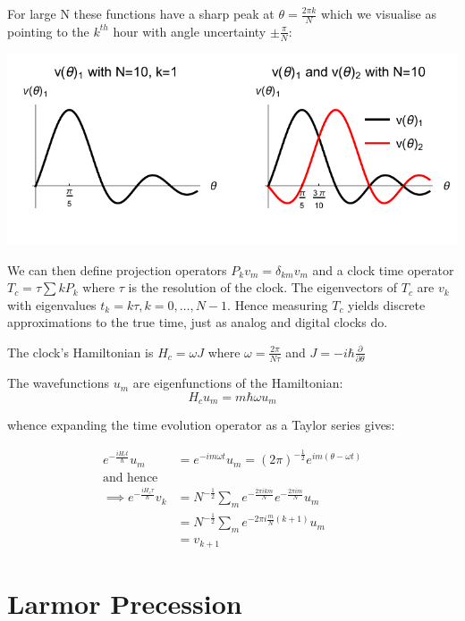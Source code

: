 \documentclass{article}
\begin{document}
For large N these functions have a sharp peak at $\theta = \frac{2\pi k}{N}$ which we visualise as pointing to the $k^{th}$ hour with angle uncertainty $\pm \frac{\pi}{N}$:

\begin{center}
\includegraphics{plot1.pdf}
\end{center}

We can then define projection operators $P_kv_m=\delta_{km}v_m$ and a clock time operator $T_c = \tau\sum{kP_k}$ where $\tau$ is the resolution of the clock. The eigenvectors of $T_c$ are $v_k$ with eigenvalues $t_k = k\tau, k=0,\dots,N-1$. Hence measuring $T_c$ yields discrete approximations to the true time, just as analog and digital clocks do. 

The clock's Hamiltonian is $H_c = \omega J$ where $\omega = \frac{2\pi}{N\tau}$ and $J=-i\hbar \frac{\partial}{\partial\theta}$

The wavefunctions $u_m$ are eigenfunctions of the Hamiltonian:
\[
H_cu_m = m\hbar\omega u_m
\] 

whence expanding the time evolution operator as a Taylor series gives:

\begin{align}
	e^{-\frac{iH_ct}{\hbar}}u_m &= e^{-im\omega t}u_m = (2\pi)^{-\frac{1}{2}}e^{im(\theta-\omega t)} \\
\text{and hence} \\
	\implies e^{-\frac{iH_c\tau}{\hbar}}v_k &= N^{-\frac{1}{2}}\sum_{m}e^{-\frac{2\pi ikm}{N}}e^{-\frac{2\pi im}{N}}u_m \\
						       &= N^{-\frac{1}{2}}\sum_{m}e^{-2\pi i \frac{m}{N}(k+1)}u_m \\
						       &= v_{k+1}
\end{align}

\section{Larmor Precession}
\end{document}
